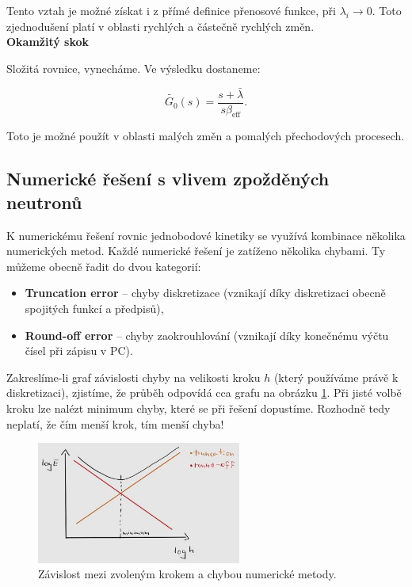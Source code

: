 Tento vztah je možné získat i z přímé definice přenosové funkce, při $\lambda_i \rightarrow 0$. Toto zjednodušení platí v oblasti rychlých a částečně rychlých změn.\\

\textbf{Okamžitý skok}

Složitá rovnice, vynecháme. Ve výsledku dostaneme:

$$ \tilde{G_0} (s) = \dfrac{s+\bar{\lambda}}{s \beta_{\text{eff}}}. $$

Toto je možné použít v oblasti malých změn a pomalých přechodových procesech.



\subsection{Numerické řešení s vlivem zpožděných neutronů}

K numerickému řešení rovnic jednobodové kinetiky se využívá kombinace několika numerických metod. Každé numerické řešení je zatíženo několika chybami. Ty můžeme obecně řadit do dvou kategorií:

\begin{itemize}
  \item \textbf{Truncation error} -- chyby diskretizace (vznikají díky diskretizaci obecně spojitých funkcí a předpisů),
  \item \textbf{Round-off error} -- chyby zaokrouhlování (vznikají díky konečnému výčtu čísel při zápisu v PC).
\end{itemize}

Zakreslíme-li graf závislosti chyby na velikosti kroku $h$ (který používáme právě k diskretizaci), zjistíme, že průběh odpovídá cca grafu na obrázku \ref{fig_error}. Při jisté volbě kroku lze nalézt minimum chyby, které se při řešení dopustíme. Rozhodně tedy neplatí, že čím menší krok, tím menší chyba!

\begin{figure}[H]
 \centering
 \includegraphics[width=0.6\textwidth]{img/error.jpg}
 \caption{Závislost mezi zvoleným krokem a chybou numerické metody.}
 \label{fig_error}
\end{figure}

